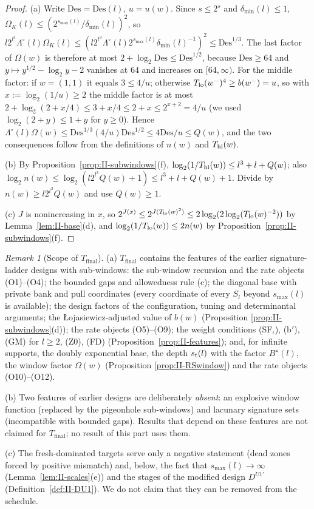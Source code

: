 \documentclass[10pt]{amsart}
\theoremstyle{definition}
\theoremstyle{remark}
\newtheorem{remark}[theorem]{Remark}
\begin{document}
\begin{proof}
(a) Write $\mathrm{Des}=\mathrm{Des}(l)$, $u=u(w)$.  Since $s\le2^s$ and
$\delta_{\min}(l)\le1$, $\Omega_K(l)\le(2^{s_{\max}(l)}/\delta_{\min}(l))^2$,
so $l2^{l^3}\Lambda^\circ(l)\Omega_K(l)\le(l2^{l^3}\Lambda^\circ(l)
2^{s_{\max}(l)}\delta_{\min}(l)^{-1})^2\le\mathrm{Des}^{1/3}$.  The last
factor of $\Omega(w)$ is therefore at most $2+\log_2\mathrm{Des}\le
\mathrm{Des}^{1/2}$, because $\mathrm{Des}\ge64$ and
$y\mapsto y^{1/2}-\log_2y-2$ vanishes at $64$ and increases on
$[64,\infty)$.  For the middle factor: if $w=(1,1)$ it equals $3\le4/u$;
otherwise $T_{\rm lo}(w^-)^4\ge b(w^-)=u$, so with $x:=\log_2(1/u)\ge2$
the middle factor is at most $2+\log_2(2+x/4)\le3+x/4\le2+x\le2^{x+2}=4/u$
(we used $\log_2(2+y)\le1+y$ for $y\ge0$).
Hence $\Lambda^\circ(l)\Omega(w)\le\mathrm{Des}^{1/3}(4/u)
\mathrm{Des}^{1/2}\le4\mathrm{Des}/u\le Q(w)$, and the two consequences
follow from the definitions of $n(w)$ and $T_{\rm hi}(w)$.

(b) By Proposition~\ref{prop:II-subwindows}(f),
$\log_2(1/T_{\rm hi}(w))\le l^3+l+Q(w)$; also $\log_2n(w)\le
\log_2(l2^{l^3}Q(w)+1)\le l^3+l+Q(w)+1$.  Divide by $n(w)\ge l2^{l^3}Q(w)$
and use $Q(w)\ge1$.

(c) $J$ is nonincreasing in $x$, so $2^{J(x)}\le2^{J(T_{\rm lo}(w)^2)}\le
2\log_2(2\log_2(T_{\rm lo}(w)^{-2}))$ by Lemma~\ref{lem:II-base}(d), and
$\log_2(1/T_{\rm lo}(w))\le2n(w)$ by
Proposition~\ref{prop:II-subwindows}(f).
\end{proof}

\begin{remark}[Scope of $T_{\mathrm{final}}$]\label{rem:II-scope}
(a) $T_{\mathrm{final}}$ contains the features of the earlier
signature-ladder designs with sub-windows: the sub-window recursion and
the rate objects (O1)--(O4); the bounded gaps and allowedness rule (c);
the diagonal base with private bank and pull coordinates (every
coordinate of every $S_l$ beyond $s_{\max}(l)$ is available); the
design factors of the configuration, tuning and determinantal arguments;
the {\L}ojasiewicz-adjusted value of $b(w)$ (Proposition
\ref{prop:II-subwindows}(d)); the rate objects (O5)--(O9); the weight
conditions (SF$_\iota$), (b$'$), (GM) for $l\ge2$, (Z0), (FD)
(Proposition~\ref{prop:II-features}); and, for infinite supports, the
doubly exponential base, the depth $s_{\rm t}(l)$ with the factor
$B^\star(l)$, the window factor $\Omega(w)$ (Proposition
\ref{prop:II-RSwindow}) and the rate objects (O10)--(O12).

(b) Two features of earlier designs are deliberately \emph{absent}: an
explosive window function (replaced by the pigeonhole sub-windows) and
lacunary signature sets (incompatible with bounded gaps).  Results that
depend on these features are not claimed for $T_{\mathrm{final}}$; no
result of this part uses them.

(c) The fresh-dominated targets serve only a negative statement (dead
zones forced by positive mismatch) and, below, the fact that
$s_{\max}(l)\to\infty$ (Lemma~\ref{lem:II-scales}(e)) and the stages of the
modified design $D^{U1'}$ (Definition~\ref{def:II-DU1}).  We do not claim
that they can be removed from the schedule.
\end{remark}
\end{document}
